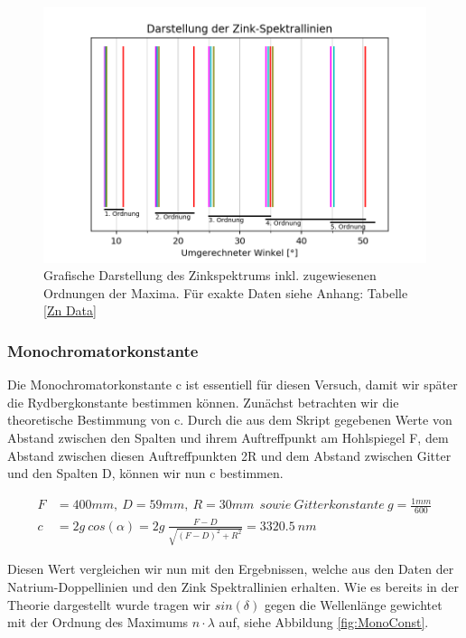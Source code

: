 \documentclass[]{article}
\begin{document}
\begin{figure}[!h]
\centering
\caption{ Grafische Darstellung des Zinkspektrums inkl. zugewiesenen Ordnungen der Maxima. Für exakte Daten siehe Anhang: Tabelle \ref{Zn Data} }
\label{fig:Zink}
\includegraphics[width=.9\linewidth]{Plots/Zink_Linien.png}

\end{figure}


\subsubsection{Monochromatorkonstante}
Die Monochromatorkonstante c ist essentiell für diesen Versuch, damit wir später die Rydbergkonstante bestimmen  können. Zunächst betrachten wir die theoretische Bestimmung von c. Durch die aus dem Skript gegebenen Werte von Abstand zwischen den Spalten und ihrem Auftreffpunkt am Hohlspiegel F, dem Abstand zwischen diesen Auftreffpunkten 2R und dem Abstand zwischen Gitter und den Spalten D, können wir nun c bestimmen. 

\begin{align}
F&= 400mm ,\: D= 59mm ,\: R=30mm \:\: sowie \: Gitterkonstante \: g=\frac{1mm}{600} \\
c&= 2g\: cos(\alpha) = 2g\: \frac{F-D}{\sqrt{(F-D)^2 + R^2}} = 3320.5\:nm
\end{align}

Diesen Wert vergleichen wir nun mit den Ergebnissen, welche aus den Daten der Natrium-Doppellinien und den Zink Spektrallinien erhalten. Wie es bereits in der Theorie dargestellt wurde tragen wir $sin(\delta)$ gegen die Wellenlänge gewichtet mit der Ordnung des Maximums $n\cdot\lambda$ auf, siehe Abbildung \ref{fig:MonoConst}.
\end{document}
